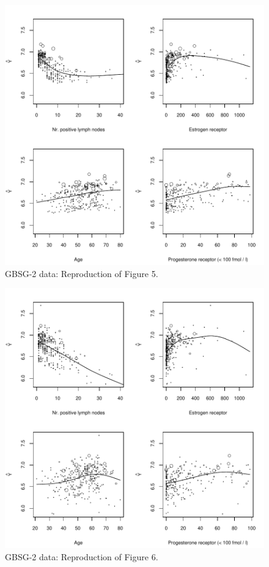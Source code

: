 \documentclass{article}
\begin{document}
\begin{figure}
\begin{center}
\includegraphics{SurvivalEnsembles-Figure5}
\caption{GBSG-2 data: Reproduction of Figure 5.}
\end{center}
\end{figure}


\begin{figure}
\begin{center}
\includegraphics{SurvivalEnsembles-Figure6}
\caption{GBSG-2 data: Reproduction of Figure 6.}
\end{center}
\end{figure}
\end{document}
